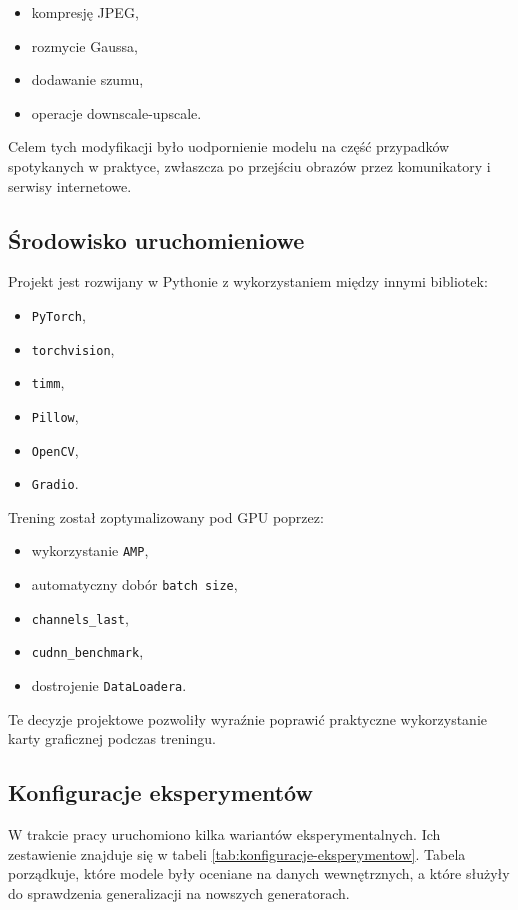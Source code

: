 \begin{itemize}
    \item kompresję JPEG,
    \item rozmycie Gaussa,
    \item dodawanie szumu,
    \item operacje downscale-upscale.
\end{itemize}

Celem tych modyfikacji było uodpornienie modelu na część przypadków spotykanych w praktyce, zwłaszcza po przejściu obrazów przez komunikatory i serwisy internetowe.

\subsection{Środowisko uruchomieniowe}

Projekt jest rozwijany w Pythonie z wykorzystaniem między innymi bibliotek:

\begin{itemize}
    \item \texttt{PyTorch},
    \item \texttt{torchvision},
    \item \texttt{timm},
    \item \texttt{Pillow},
    \item \texttt{OpenCV},
    \item \texttt{Gradio}.
\end{itemize}

Trening został zoptymalizowany pod GPU poprzez:

\begin{itemize}
    \item wykorzystanie \texttt{AMP},
    \item automatyczny dobór \texttt{batch size},
    \item \texttt{channels\_last},
    \item \texttt{cudnn\_benchmark},
    \item dostrojenie \texttt{DataLoadera}.
\end{itemize}

Te decyzje projektowe pozwoliły wyraźnie poprawić praktyczne wykorzystanie karty graficznej podczas treningu.

\subsection{Konfiguracje eksperymentów}

W trakcie pracy uruchomiono kilka wariantów eksperymentalnych. Ich zestawienie znajduje się w tabeli \ref{tab:konfiguracje-eksperymentow}. Tabela porządkuje, które modele były oceniane na danych wewnętrznych, a które służyły do sprawdzenia generalizacji na nowszych generatorach.

